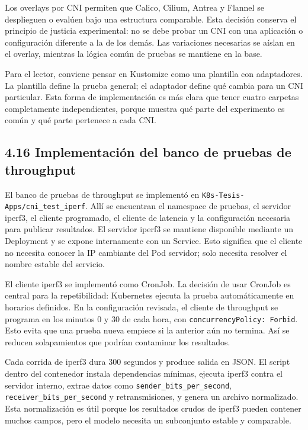 Los overlays por CNI permiten que Calico, Cilium, Antrea y Flannel se desplieguen o evalúen bajo una estructura comparable. Esta decisión conserva el principio de justicia experimental: no se debe probar un CNI con una aplicación o configuración diferente a la de los demás. Las variaciones necesarias se aíslan en el overlay, mientras la lógica común de pruebas se mantiene en la base.

Para el lector, conviene pensar en Kustomize como una plantilla con adaptadores. La plantilla define la prueba general; el adaptador define qué cambia para un CNI particular. Esta forma de implementación es más clara que tener cuatro carpetas completamente independientes, porque muestra qué parte del experimento es común y qué parte pertenece a cada CNI.

\subsection{4.16 Implementación del banco de pruebas de throughput}

El banco de pruebas de throughput se implementó en \texttt{K8s-Tesis-Apps/cni\_test\_iperf}. Allí se encuentran el namespace de pruebas, el servidor iperf3, el cliente programado, el cliente de latencia y la configuración necesaria para publicar resultados. El servidor iperf3 se mantiene disponible mediante un Deployment y se expone internamente con un Service. Esto significa que el cliente no necesita conocer la IP cambiante del Pod servidor; solo necesita resolver el nombre estable del servicio.

El cliente iperf3 se implementó como CronJob. La decisión de usar CronJob es central para la repetibilidad: Kubernetes ejecuta la prueba automáticamente en horarios definidos. En la configuración revisada, el cliente de throughput se programa en los minutos 0 y 30 de cada hora, con \texttt{concurrencyPolicy: Forbid}. Esto evita que una prueba nueva empiece si la anterior aún no termina. Así se reducen solapamientos que podrían contaminar los resultados.

Cada corrida de iperf3 dura 300 segundos y produce salida en JSON. El script dentro del contenedor instala dependencias mínimas, ejecuta iperf3 contra el servidor interno, extrae datos como \texttt{sender\_bits\_per\_second}, \texttt{receiver\_bits\_per\_second} y retransmisiones, y genera un archivo normalizado. Esta normalización es útil porque los resultados crudos de iperf3 pueden contener muchos campos, pero el modelo necesita un subconjunto estable y comparable.

